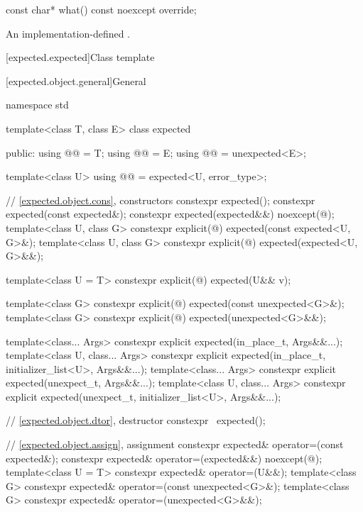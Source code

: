 %
\begin{itemdecl}
const char* what() const noexcept override;
\end{itemdecl}

\begin{itemdescr}
\pnum
\returns
An implementation-defined \ntbs.
\end{itemdescr}

[expected.expected]{Class template }

[expected.object.general]{General}

\begin{codeblock}
namespace std {
  template<class T, class E>
  class expected {
  public:
    using @@ = T;
    using @@ = E;
    using @@ = unexpected<E>;

    template<class U>
    using @@ = expected<U, error_type>;

    // \ref{expected.object.cons}, constructors
    constexpr expected();
    constexpr expected(const expected&);
    constexpr expected(expected&&) noexcept(@\seebelow@);
    template<class U, class G>
      constexpr explicit(@\seebelow@) expected(const expected<U, G>&);
    template<class U, class G>
      constexpr explicit(@\seebelow@) expected(expected<U, G>&&);

    template<class U = T>
      constexpr explicit(@\seebelow@) expected(U&& v);

    template<class G>
      constexpr explicit(@\seebelow@) expected(const unexpected<G>&);
    template<class G>
      constexpr explicit(@\seebelow@) expected(unexpected<G>&&);

    template<class... Args>
      constexpr explicit expected(in_place_t, Args&&...);
    template<class U, class... Args>
      constexpr explicit expected(in_place_t, initializer_list<U>, Args&&...);
    template<class... Args>
      constexpr explicit expected(unexpect_t, Args&&...);
    template<class U, class... Args>
      constexpr explicit expected(unexpect_t, initializer_list<U>, Args&&...);

    // \ref{expected.object.dtor}, destructor
    constexpr ~expected();

    // \ref{expected.object.assign}, assignment
    constexpr expected& operator=(const expected&);
    constexpr expected& operator=(expected&&) noexcept(@\seebelow@);
    template<class U = T> constexpr expected& operator=(U&&);
    template<class G>
      constexpr expected& operator=(const unexpected<G>&);
    template<class G>
      constexpr expected& operator=(unexpected<G>&&);

}}
\end{codeblock}
